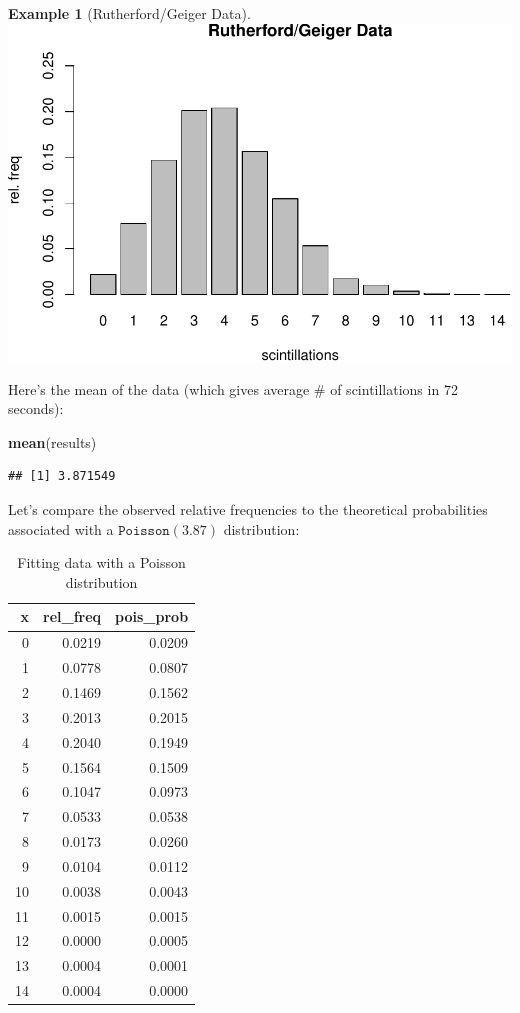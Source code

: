 \documentclass[
]{book}
\newenvironment{Shaded}{\begin{snugshade}}{\end{snugshade}}
\newcommand{\FunctionTok}[1]{\textcolor[rgb]{0.13,0.29,0.53}{\textbf{#1}}}
\newcommand{\NormalTok}[1]{#1}
\theoremstyle{definition}
\theoremstyle{definition}
\newtheorem{example}{Example}[chapter]
\theoremstyle{definition}
\theoremstyle{definition}
\theoremstyle{remark}
\begin{document}
\begin{example}[Rutherford/Geiger Data]
\includegraphics{math340-notes_files/figure-latex/unnamed-chunk-178-1.pdf}

Here's the mean of the data (which gives average \# of scintillations in 72 seconds):

\begin{Shaded}
\begin{Highlighting}[]
\FunctionTok{mean}\NormalTok{(results)}
\end{Highlighting}
\end{Shaded}

\begin{verbatim}
## [1] 3.871549
\end{verbatim}

Let's compare the observed relative frequencies to the theoretical probabilities associated with a \(\texttt{Poisson}(3.87)\) distribution:

\begin{table}
\centering
\caption{\label{tab:unnamed-chunk-180}Fitting data with a Poisson distribution}
\centering
\begin{tabular}[t]{r|r|r}
\hline
x & rel\_freq & pois\_prob\\
\hline
0 & 0.0219 & 0.0209\\
\hline
1 & 0.0778 & 0.0807\\
\hline
2 & 0.1469 & 0.1562\\
\hline
3 & 0.2013 & 0.2015\\
\hline
4 & 0.2040 & 0.1949\\
\hline
5 & 0.1564 & 0.1509\\
\hline
6 & 0.1047 & 0.0973\\
\hline
7 & 0.0533 & 0.0538\\
\hline
8 & 0.0173 & 0.0260\\
\hline
9 & 0.0104 & 0.0112\\
\hline
10 & 0.0038 & 0.0043\\
\hline
11 & 0.0015 & 0.0015\\
\hline
12 & 0.0000 & 0.0005\\
\hline
13 & 0.0004 & 0.0001\\
\hline
14 & 0.0004 & 0.0000\\
\hline
\end{tabular}
\end{table}


\end{example}
\end{document}
